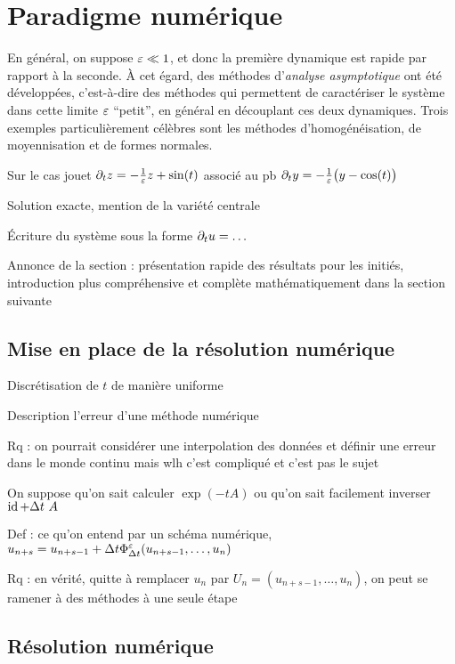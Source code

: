 \section*{Paradigme numérique}

En général, on suppose $\varepsilon \ll 1$, et donc la première dynamique est rapide par rapport à la seconde. À cet égard, des méthodes d'\textit{analyse asymptotique} ont été développées, c'est-à-dire des méthodes qui permettent de caractériser le système dans cette limite $\varepsilon$ \enquote{petit}, en général en découplant ces deux dynamiques. Trois exemples particulièrement célèbres sont les méthodes d'homogénéisation, de moyennisation et de formes normales. 


Sur le cas jouet $\partial_t z = -\frac{1}{\varepsilon}z + \sin(t)$ associé au pb $\partial_t y = -\frac{1}{\varepsilon} \big( y - \cos(t) \big)$

Solution exacte, mention de la variété centrale

Écriture du système sous la forme $\partial_t u = \ldots$

Annonce de la section : présentation rapide des résultats pour les initiés, introduction plus compréhensive et complète mathématiquement dans la section suivante


\subsection*{Mise en place de la résolution numérique}

Discrétisation de $t$ de manière uniforme

Description l’erreur d’une méthode numérique 

Rq : on pourrait considérer une interpolation des données et définir une erreur dans le monde continu mais wlh c’est compliqué et c’est pas le sujet

On suppose qu’on sait calculer $\exp(-t A)$ ou qu’on sait facilement inverser $\id + \Dt \ A$

Def : ce qu’on entend par un schéma numérique, $u_{n+s} = u_{n+s-1} + \Delta t \Phi^{\varepsilon}_{\Delta t} (u_{n+s-1}, \ldots, u_n)$

Rq : en vérité, quitte à remplacer $u_n$ par $U_n = (u_{n+s-1}, \ldots, u_n)$, on peut se ramener à des méthodes à une seule étape


\subsection*{Résolution numérique}

